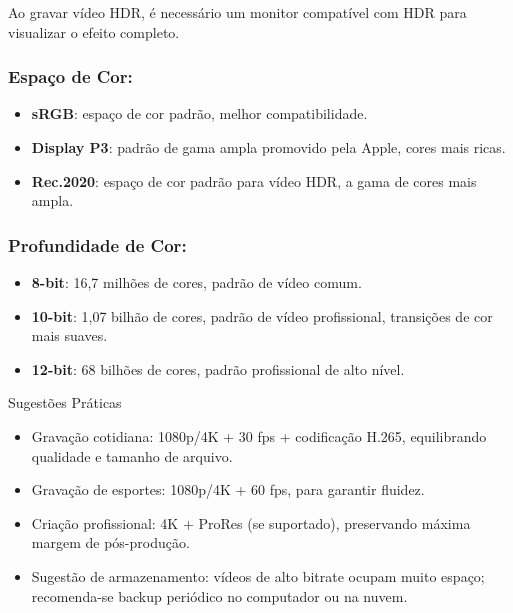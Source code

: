 Ao gravar vídeo HDR, é necessário um monitor compatível com HDR para visualizar o efeito completo.


\subsubsection*{Espaço de Cor:}

\begin{itemize}
  \item \textbf{sRGB}: espaço de cor padrão, melhor compatibilidade.
  \item \textbf{Display P3}: padrão de gama ampla promovido pela Apple, cores mais ricas.
  \item \textbf{Rec.2020}: espaço de cor padrão para vídeo HDR, a gama de cores mais ampla.
\end{itemize}

\subsubsection*{Profundidade de Cor:}

\begin{itemize}
  \item \textbf{8-bit}: 16,7 milhões de cores, padrão de vídeo comum.
  \item \textbf{10-bit}: 1,07 bilhão de cores, padrão de vídeo profissional, transições de cor mais suaves.
  \item \textbf{12-bit}: 68 bilhões de cores, padrão profissional de alto nível.
\end{itemize}

\begin{tcbinfo}{Sugestões Práticas}
\begin{itemize}
  \item Gravação cotidiana: 1080p/4K + 30 fps + codificação H.265, equilibrando qualidade e tamanho de arquivo.
  \item Gravação de esportes: 1080p/4K + 60 fps, para garantir fluidez.
  \item Criação profissional: 4K + ProRes (se suportado), preservando máxima margem de pós-produção.
  \item Sugestão de armazenamento: vídeos de alto bitrate ocupam muito espaço; recomenda-se backup periódico no computador ou na nuvem.
\end{itemize}

\end{tcbinfo}

